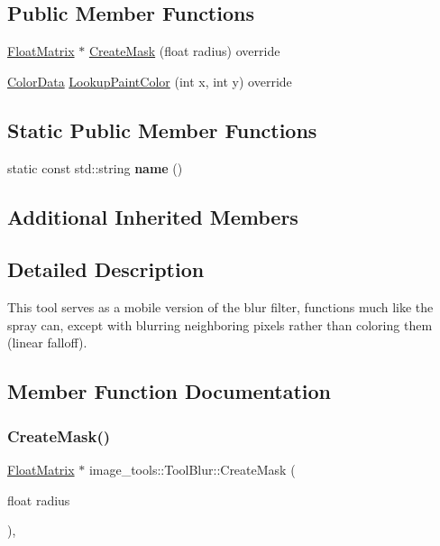 \subsection*{Public Member Functions}
\begin{DoxyCompactItemize}
\item 
\hyperlink{classimage__tools_1_1FloatMatrix}{Float\+Matrix} $\ast$ \hyperlink{classimage__tools_1_1ToolBlur_a75690cef3c70c2f8db56b7106d7cd08c}{Create\+Mask} (float radius) override
\item 
\hyperlink{classimage__tools_1_1ColorData}{Color\+Data} \hyperlink{classimage__tools_1_1ToolBlur_af709da063f86da74d878d079fd2aab5e}{Lookup\+Paint\+Color} (int x, int y) override
\end{DoxyCompactItemize}
\subsection*{Static Public Member Functions}
\begin{DoxyCompactItemize}
\item 
\mbox{\label{classimage__tools_1_1ToolBlur_a8faee980a676d32430a6e7440e929ce6}} 
static const std\+::string {\bfseries name} ()
\end{DoxyCompactItemize}
\subsection*{Additional Inherited Members}


\subsection{Detailed Description}
This tool serves as a mobile version of the blur filter, functions much like the spray can, except with blurring neighboring pixels rather than coloring them (linear falloff). 

\subsection{Member Function Documentation}
\mbox{\label{classimage__tools_1_1ToolBlur_a75690cef3c70c2f8db56b7106d7cd08c}} 
\subsubsection{\texorpdfstring{Create\+Mask()}{CreateMask()}}
{\footnotesize\ttfamily \hyperlink{classimage__tools_1_1FloatMatrix}{Float\+Matrix} $\ast$ image\+\_\+tools\+::\+Tool\+Blur\+::\+Create\+Mask (\begin{DoxyParamCaption}\item[{float}]{radius }\end{DoxyParamCaption})\hspace{0.3cm}{\ttfamily [override]}, {\ttfamily [virtual]}}

